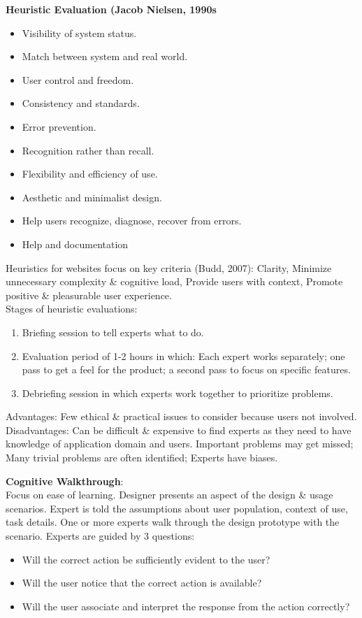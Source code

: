 \textbf{Heuristic Evaluation (Jacob Nielsen, 1990s}
\begin{itemize}
\item Visibility of system status.
\item Match between system and real world.
\item User control and freedom.
\item Consistency and standards.
\item Error prevention.
\item Recognition rather than recall.
\item Flexibility and efficiency of use.
\item Aesthetic and minimalist design.
\item Help users recognize, diagnose, recover from errors.
\item Help and documentation
\end{itemize}

Heuristics for websites focus on key criteria (Budd, 2007): Clarity, Minimize unnecessary complexity \& cognitive load, Provide users with context, Promote positive \& pleasurable user
experience.\\
Stages of heuristic evaluations:
\begin{enumerate}
\item Briefing session to tell experts what to do.
\item Evaluation period of 1-2 hours in which: Each expert works separately; one pass to get a feel for the product; a second pass to focus on specific features.
\item Debriefing session in which experts work together to prioritize problems.
\end{enumerate}

Advantages: Few ethical \& practical issues to consider because users not involved.\\
Disadvantages: Can be difficult \& expensive to find experts as they need to have knowledge of application domain and users. Important problems may get missed; Many trivial problems are often identified; Experts have biases.

\textbf{Cognitive Walkthrough}:\\
Focus on ease of learning. Designer presents an aspect of the design \& usage scenarios. Expert is told the assumptions about user population, context of use, task details. One or more experts walk through the design prototype with the scenario. Experts are guided by 3 questions:
\begin{itemize}
\item Will the correct action be sufficiently evident to the user?
\item Will the user notice that the correct action is available?
\item Will the user associate and interpret the response from the action correctly?
\end{itemize}

